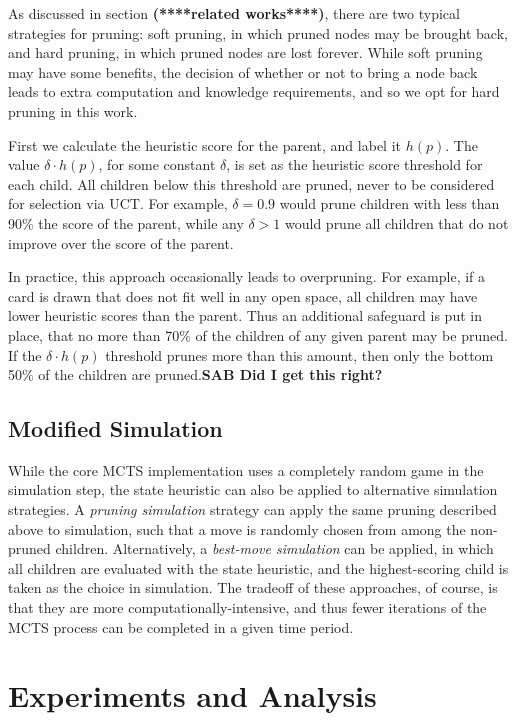 \documentclass[letterpaper]{article}
\begin{document}
As discussed in section {\bf (****related works****)}, there are two typical strategies for pruning: soft pruning, in which pruned nodes may be brought back, and hard pruning, in which pruned nodes are lost forever. While soft pruning may have some benefits, the decision of whether or not to bring a node back leads to extra computation and knowledge requirements, and so we opt for hard pruning in this work.

First we calculate the heuristic score for the parent, and label it $h(p)$. The value $\delta \cdot h(p)$, for some constant $\delta$, is set as the heuristic score threshold for each child. All children below this threshold are pruned, never to be considered for selection via UCT. For example, $\delta = 0.9$ would prune children with less than 90\% the score of the parent, while any $\delta > 1$ would prune all children that do not improve over the score of the parent.

In practice, this approach occasionally leads to overpruning. For example, if a card is drawn that does not fit well in any open space, all children may have lower heuristic scores than the parent. Thus an additional safeguard is put in place, that no more than 70\% of the children of any given parent may be pruned. If the  $\delta \cdot h(p)$ threshold prunes more than this amount, then only the bottom 50\% of the children are pruned.{\bf SAB Did I get this right?}

\subsection{Modified Simulation}

While the core MCTS implementation uses a completely random game in the simulation step, the state heuristic can also be applied to alternative simulation strategies. A {\it pruning simulation} strategy can apply the same pruning described above to simulation, such that a move is randomly chosen from among the non-pruned children. Alternatively, a {\it best-move simulation} can be applied, in which all children are evaluated with the state heuristic, and the highest-scoring child is taken as the choice in simulation. The tradeoff of these approaches, of course, is that they are more computationally-intensive, and thus fewer iterations of the MCTS process can be completed in a given time period. 

\section{Experiments and Analysis}
\end{document}
